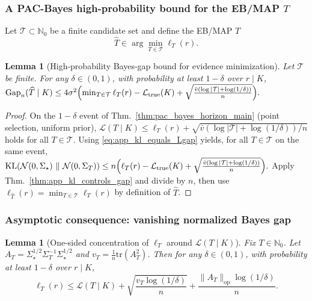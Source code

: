 \documentclass{article}
\theoremstyle{plain}
\newtheorem{lemma}[theorem]{Lemma}
\theoremstyle{definition}
\theoremstyle{remark}
\begin{document}
\subsubsection{A PAC-Bayes high-probability bound for the EB/MAP $T$}

Let $\mathcal T\subset\mathbb N_0$ be a finite candidate set and define the EB/MAP $T$
\begin{equation}
\widehat T\in\arg\min_{T\in\mathcal T}\ell_T(r).
\label{eq:app_T_hat_EB_def}
\end{equation}

\begin{lemma}[High-probability Bayes-gap bound for evidence minimization]
\label{cor:app_gap_bound_EB}
Let $\mathcal T$ be finite. For any $\delta\in(0,1)$, with probability at least $1-\delta$ over $r\mid K$,
$ \mathrm{Gap}_n(\widehat T\mid K) \le 4\sigma^2\Bigl(
\min_{T\in\mathcal T}\ell_T(r)-\mathcal L_{\mathrm{true}}(K) + \sqrt{\frac{\bar v(\log|\mathcal T|+\log(1/\delta))}{n}} \Bigr).$
\end{lemma}

\begin{proof}
On the $1-\delta$ event of Thm.~\ref{thm:pac_bayes_horizon_main} (point selection, uniform prior),
$\mathcal L(T\mid K)\le \ell_T(r)+\sqrt{\bar v(\log|\mathcal T|+\log(1/\delta))/n}$ holds for all $T\in\mathcal T$.
Using \eqref{eq:app_kl_equals_Lgap} yields, for all $T\in\mathcal T$ on the same event, $\mathrm{KL}\!\left(\mathcal N(0,\Sigma_\star)\ \|\ \mathcal N(0,\Sigma_T)\right)
\le
n\Bigl(\ell_T(r)-\mathcal L_{\mathrm{true}}(K)+\sqrt{\tfrac{\bar v(\log|\mathcal T|+\log(1/\delta))}{n}}\Bigr).$
Apply Thm.~\ref{thm:app_kl_controls_gap} and divide by $n$, then use
$\ell_{\widehat T}(r)=\min_{T\in\mathcal T}\ell_T(r)$ by definition of $\widehat T$.
\end{proof}

\subsubsection{Asymptotic consequence: vanishing normalized Bayes gap}

\begin{lemma}[One-sided concentration of $\ell_T$ around $\mathcal L(T\mid K)$]
\label{lem:app_ell_upper_conc}
Fix $T\in\mathbb N_0$. Let
$A_T=\Sigma_\star^{1/2}\Sigma_T^{-1}\Sigma_\star^{1/2}$ and $v_T=\frac1n\mathrm{tr}(A_T^2)$.
Then for any $\delta\in(0,1)$, with probability at least $1-\delta$ over $r\mid K$,
\begin{equation}
\ell_T(r)
\le
\mathcal L(T\mid K)
+
\sqrt{\frac{v_T\log(1/\delta)}{n}}
+
\frac{\|A_T\|_{\mathrm{op}}\log(1/\delta)}{n}.
\label{eq:app_ell_upper_conc}
\end{equation}
\end{lemma}
\end{document}
